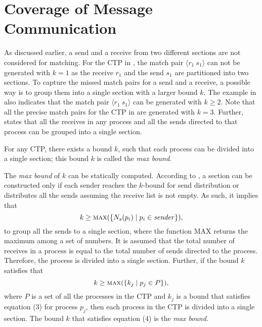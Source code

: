 \section{Coverage of Message Communication}

As discussed earlier, a send and a receive from two different sections are not considered for matching. For the CTP in , the match pair $\langle r_1\ s_1\rangle$ can not be generated with $k=1$ as the receive $r_1$ and the send $s_1$ are partitioned into two sections. 
To capture the missed match pairs for a send and a receive, a possible way is to group them into a single section with a larger bound $k$. The example in  also indicates that the match pair $\langle r_1\ s_1\rangle$ can be generated with $k\geq2$.  
Note that all the precise match pairs for the CTP in  are generated with $k=3$.
Further,  states that all the receives in any process and all the sends directed to that process can be grouped into a single section.
 
\begin{definition}
\label{def:maxbound}
For any CTP, there exists a bound $k$, such that each process can be divided into a single section; this bound $k$ is called the \textit{max bound}. 
\end{definition} 

The \textit{max bound} of $k$ can be statically computed. 
According to , a section can be constructed only if each sender reaches the $k$-bound for send distribution or distributes all the sends assuming the receive list is not empty. As such, it implies that 
\begin{equation}
k\ge \Call{max}{\{N_s(p_i)\mid p_i \in \mathit{sender}\}},
\end{equation}
to group all the sends to a single section, where the function $\mathrm{MAX}$ returns the maximum among a set of numbers. It is assumed that the total number of receives in a process is equal to the total number of sends directed to the process. Therefore, the process is divided into a single section. Further, if the bound $k$ satisfies that  
\begin{equation}
k\ge \Call{max}{\{k_j \mid p_j\in P\}},
\end{equation} 
where $P$ is a set of all the processes in the CTP and $k_j$ is a bound that satisfies equation (3) for process $p_j$, then each process in the CTP is divided into a single section. The bound $k$ that satisfies equation (4) is the \textit{max bound}. 
 
